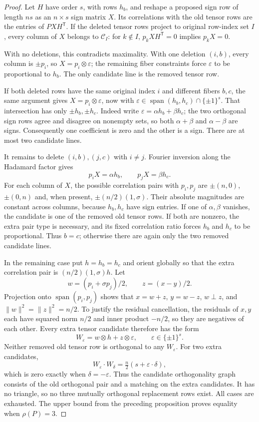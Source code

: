 \documentclass[11pt]{article}
\begin{document}
\begin{proof}
Let $H$ have order $s$, with rows $h_b$, and reshape a proposed sign
row of length $ns$ as an $n\times s$ sign matrix $X$. Its correlations
with the old tensor rows are the entries of $PXH^{\mathsf T}$.
If the deleted tensor rows project to original row-index set $I$,
every column of $X$ belongs to $\mathcal C_I$: for $k\notin I$,
$p_kXH^{\mathsf T}=0$ implies $p_kX=0$.

With no deletions, this contradicts maximality. With one deletion
$(i,b)$, every column is $\pm p_i$, so $X=p_i\otimes\varepsilon$;
the remaining fiber constraints force $\varepsilon$ to be proportional
to $h_b$. The only candidate line is the removed tensor row.

If both deleted rows have the same original index $i$ and different
fibers $b,c$, the same argument gives $X=p_i\otimes\varepsilon$, now
with $\varepsilon\in\operatorname{span}(h_b,h_c)\cap\{\pm1\}^s$.
That intersection has only $\pm h_b,\pm h_c$. Indeed write
$\varepsilon=\alpha h_b+\beta h_c$; the two orthogonal sign rows
agree and disagree on nonempty sets, so both $\alpha+\beta$ and
$\alpha-\beta$ are signs. Consequently one coefficient is zero and
the other is a sign. There are at most two candidate lines.

It remains to delete $(i,b),(j,c)$ with $i\ne j$. Fourier inversion
along the Hadamard factor gives
\[
 p_iX=\alpha h_b,\qquad p_jX=\beta h_c.
\]
For each column of $X$, the possible correlation pairs with $p_i,p_j$
are $\pm(n,0)$, $\pm(0,n)$ and, when present,
$\pm(n/2)(1,\sigma)$. Their absolute magnitudes are constant across
columns, because $h_b,h_c$ have sign entries. If one of $\alpha,\beta$
vanishes, the candidate is one of the removed old tensor rows. If both
are nonzero, the extra pair type is necessary, and its fixed correlation
ratio forces $h_b$ and $h_c$ to be proportional. Thus $b=c$; otherwise
there are again only the two removed candidate lines.

In the remaining case put $h=h_b=h_c$ and orient globally so that the
extra correlation pair is $(n/2)(1,\sigma)h$.
Let
\[
 w=(p_i+\sigma p_j)/2,\qquad z=(x-y)/2.
\]
Projection onto $\operatorname{span}(p_i,p_j)$ shows that
$x=w+z$, $y=w-z$, $w\perp z$, and
$\|w\|^2=\|z\|^2=n/2$. To justify the residual cancellation, the
residuals of $x,y$ each have squared norm $n/2$ and inner product
$-n/2$, so they are negatives of each other. Every extra tensor
candidate therefore has the form
\[
 W_{\varepsilon}=w\otimes h+z\otimes\varepsilon,
 \qquad\varepsilon\in\{\pm1\}^s.
\]
Neither removed old tensor row is orthogonal to any $W_\varepsilon$.
For two extra candidates,
\[
 W_\varepsilon\cdot W_\delta
 =\tfrac n2(s+\varepsilon\cdot\delta),
\]
which is zero exactly when $\delta=-\varepsilon$. Thus the candidate
orthogonality graph consists of the old orthogonal pair and a matching
on the extra candidates. It has no triangle, so no three mutually
orthogonal replacement rows exist. All cases are exhausted.
The upper bound from the preceding proposition proves equality when
$\rho(P)=3$.
\end{proof}
\end{document}
